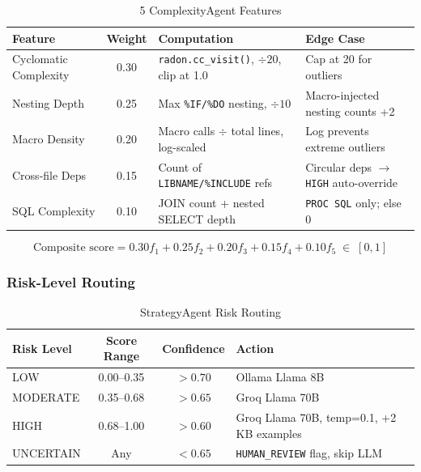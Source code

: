 \documentclass[11pt,a4paper]{article}
\begin{document}
\begin{table}[H]
\centering
\caption{5 ComplexityAgent Features}
\renewcommand{\arraystretch}{1.3}
\small
\begin{tabularx}{\textwidth}{@{} l c L{4cm} X @{}}
\toprule
\textbf{Feature} & \textbf{Weight} & \textbf{Computation} & \textbf{Edge Case} \\
\midrule
Cyclomatic Complexity & 0.30 & \texttt{radon.cc\_visit()}, $\div 20$, clip at 1.0 & Cap at 20 for outliers \\
Nesting Depth & 0.25 & Max \texttt{\%IF/\%DO} nesting, $\div 10$ & Macro-injected nesting counts +2 \\
Macro Density & 0.20 & Macro calls $\div$ total lines, log-scaled & Log prevents extreme outliers \\
Cross-file Deps & 0.15 & Count of \texttt{LIBNAME/\%INCLUDE} refs & Circular deps $\to$ \texttt{HIGH} auto-override \\
SQL Complexity & 0.10 & JOIN count + nested SELECT depth & \texttt{PROC SQL} only; else 0 \\
\bottomrule
\end{tabularx}
\end{table}

$$\text{Composite score} = 0.30 f_1 + 0.25 f_2 + 0.20 f_3 + 0.15 f_4 + 0.10 f_5 \;\in\; [0, 1]$$

\subsubsection{Risk-Level Routing}

\begin{table}[H]
\centering
\caption{StrategyAgent Risk Routing}
\renewcommand{\arraystretch}{1.3}
\begin{tabularx}{\textwidth}{@{} l c c X @{}}
\toprule
\textbf{Risk Level} & \textbf{Score Range} & \textbf{Confidence} & \textbf{Action} \\
\midrule
\rowcolor{successgreen!8} LOW & 0.00–0.35 & $>0.70$ & Ollama Llama 8B \\
\rowcolor{warncolor!8} MODERATE & 0.35–0.68 & $>0.65$ & Groq Llama 70B \\
\rowcolor{dangerred!8} HIGH & 0.68–1.00 & $>0.60$ & Groq Llama 70B, temp=0.1, +2 KB examples \\
\rowcolor{codebg} UNCERTAIN & Any & $<0.65$ & \texttt{HUMAN\_REVIEW} flag, skip LLM \\
\bottomrule
\end{tabularx}
\end{table}
\end{document}
